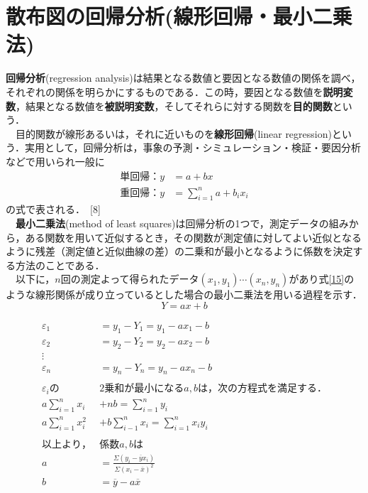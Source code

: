 \documentclass[fleqn,dvipdfmx]{jarticle}
\begin{document}
\section{散布図の回帰分析(線形回帰・最小二乗法)}
\textbf{回帰分析}(regression analysis)は結果となる数値と要因となる数値の関係を調べ，それぞれの関係を明らかにするものである．この時，要因となる数値を\textbf{説明変数}，結果となる数値を\textbf{被説明変数}，そしてそれらに対する関数を\textbf{目的関数}という．\\
　目的関数が線形あるいは，それに近いものを\textbf{線形回帰}(linear regression)という．実用として，回帰分析は，事象の予測・シミュレーション・検証・要因分析などで用いられ一般に
\begin{align}
単回帰：y&=a+bx\\
重回帰：y&=\sum_{i=1}^{n} a+b_{i}x_{i}
\end{align}
の式で表される．~[8]\\
　\space\textbf{最小二乗法}(method of least squares)は回帰分析の1つで，測定データの組みから，ある関数を用いて近似するとき，その関数が測定値に対してよい近似となるように残差（測定値と近似曲線の差）の二乗和が最小となるように係数を決定する方法のことである．\\
　以下に，$n$回の測定よって得られたデータ$(x_{1},y_{1})\cdots(x_{n},y_{n})$があり式\ref{15}のような線形関係が成り立っているとした場合の最小二乗法を用いる過程を示す．
\begin{equation}
\label{15}
Y=ax+b
\end{equation}

\begin{shadebox}
\begin{align*}
\varepsilon_{1}&=y_{1}-Y_{1}=y_{1}-ax_{1}-b\\
\varepsilon_{2}&=y_{2}-Y_{2}=y_{2}-ax_{2}-b\\
\vdots\\
\varepsilon_{n}&=y_{n}-Y_{n}=y_{n}-ax_{n}-b\\
\\
\varepsilon_{i}の&2乗和が最小になるa,bは，次の方程式を満足する．\\
a\sum_{i=1}^{n}x_{i}&+nb=\sum_{i=1}^{n}y_{i}\\
a\sum_{i=1}^{n}x_{i}^{2}&+b\sum_{i-1}^{n}x_{i}=\sum_{i=1}^{n}x_{i}y_{i}\\
\\
以上より，&係数a,bは\\
a&=\frac{\Sigma (y_{i}-\overline{y}x_{i})}{\Sigma (x_{i}-\overline{x})^{2}}\\
b&=\overline{y}-a\overline{x}
\end{align*}
\end{shadebox}
\end{document}
